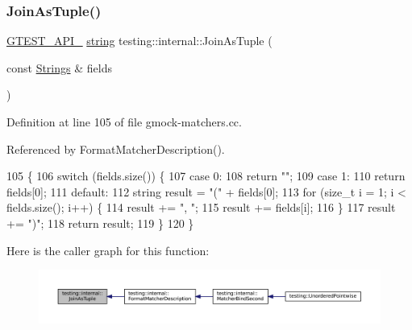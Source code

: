 \subsubsection{\texorpdfstring{Join\+As\+Tuple()}{JoinAsTuple()}}
{\footnotesize\ttfamily \hyperlink{gtest-port_8h_aa73be6f0ba4a7456180a94904ce17790}{G\+T\+E\+S\+T\+\_\+\+A\+P\+I\+\_\+} \hyperlink{namespacetesting_1_1internal_a8e8ff5b11e64078831112677156cb111}{string} testing\+::internal\+::\+Join\+As\+Tuple (\begin{DoxyParamCaption}\item[{const \hyperlink{namespacetesting_1_1internal_a7706b17f05f4b49e351b052ae4e05073}{Strings} \&}]{fields }\end{DoxyParamCaption})}



Definition at line 105 of file gmock-\/matchers.\+cc.



Referenced by Format\+Matcher\+Description().


\begin{DoxyCode}
105                                                      \{
106   \textcolor{keywordflow}{switch} (fields.size()) \{
107     \textcolor{keywordflow}{case} 0:
108       \textcolor{keywordflow}{return} \textcolor{stringliteral}{""};
109     \textcolor{keywordflow}{case} 1:
110       \textcolor{keywordflow}{return} fields[0];
111     \textcolor{keywordflow}{default}:
112       \textcolor{keywordtype}{string} result = \textcolor{stringliteral}{"("} + fields[0];
113       \textcolor{keywordflow}{for} (\textcolor{keywordtype}{size\_t} i = 1; i < fields.size(); i++) \{
114         result += \textcolor{stringliteral}{", "};
115         result += fields[i];
116       \}
117       result += \textcolor{stringliteral}{")"};
118       \textcolor{keywordflow}{return} result;
119   \}
120 \}
\end{DoxyCode}
Here is the caller graph for this function\+:
\nopagebreak
\begin{figure}[H]
\begin{center}
\leavevmode
\includegraphics[width=350pt]{namespacetesting_1_1internal_a61d60981533cb0875bad9025e0d98b74_icgraph}
\end{center}
\end{figure}
\mbox{\label{namespacetesting_1_1internal_ac0bc151763a8187d74387c4b2ba685c9}} 
